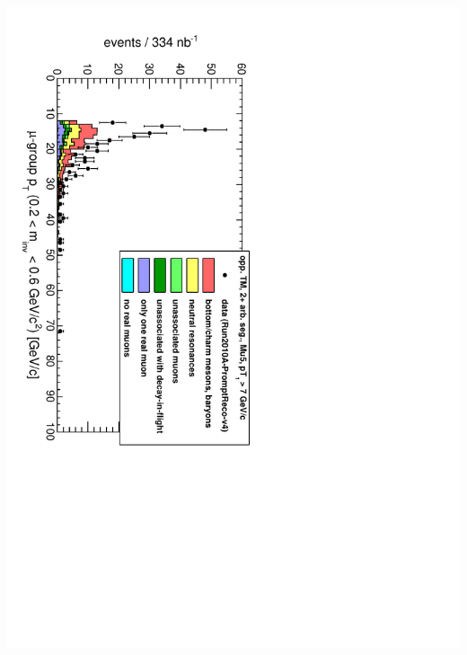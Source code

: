 \documentclass[compress]{beamer}
\begin{document}
\begin{frame}
\begin{columns}
\vspace{0.75 cm}
\includegraphics[height=\linewidth, angle=90]{Mu5_pt_eta.pdf}

\end{columns}
\end{frame}
\end{document}
